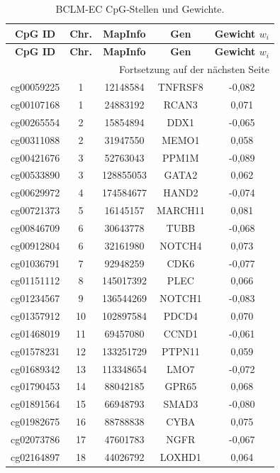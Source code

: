 \documentclass[12pt,a4paper]{article}
\begin{document}
	\begin{longtable}{|c|c|c|c|c|}
		\caption{BCLM‑EC CpG‑Stellen und Gewichte.}\label{tab:cpgs}\\
		\hline
		\textbf{CpG ID} & \textbf{Chr.} & \textbf{MapInfo} & \textbf{Gen} & \textbf{Gewicht \(w_i\)} \\
		\hline
		\endfirsthead
		\hline
		\textbf{CpG ID} & \textbf{Chr.} & \textbf{MapInfo} & \textbf{Gen} & \textbf{Gewicht \(w_i\)} \\
		\hline
		\endhead
		\hline
		\multicolumn{5}{r}{Fortsetzung auf der nächsten Seite}\\
		\endfoot
		\hline
		\endlastfoot
		cg00059225 & 1 & 12148584 & TNFRSF8 & -0,082 \\
		cg00107168 & 1 & 24883192 & RCAN3 & 0,071 \\
		cg00265554 & 2 & 15854894 & DDX1 & -0,065 \\
		cg00311088 & 2 & 31947550 & MEMO1 & 0,058 \\
		cg00421676 & 3 & 52763043 & PPM1M & -0,089 \\
		cg00533890 & 3 & 128855053 & GATA2 & 0,062 \\
		cg00629972 & 4 & 174584677 & HAND2 & -0,074 \\
		cg00721373 & 5 & 16145157 & MARCH11 & 0,081 \\
		cg00846709 & 6 & 30643778 & TUBB & -0,068 \\
		cg00912804 & 6 & 32161980 & NOTCH4 & 0,073 \\
		cg01036791 & 7 & 92948259 & CDK6 & -0,077 \\
		cg01151112 & 8 & 145017392 & PLEC & 0,066 \\
		cg01234567 & 9 & 136544269 & NOTCH1 & -0,083 \\
		cg01357912 & 10 & 102897584 & PDCD4 & 0,070 \\
		cg01468019 & 11 & 69457080 & CCND1 & -0,061 \\
		cg01578231 & 12 & 133251729 & PTPN11 & 0,059 \\
		cg01689342 & 13 & 113348654 & LMO7 & -0,072 \\
		cg01790453 & 14 & 88042185 & GPR65 & 0,068 \\
		cg01891564 & 15 & 66948793 & SMAD3 & -0,080 \\
		cg01982675 & 16 & 88788838 & CYBA & 0,075 \\
		cg02073786 & 17 & 47601783 & NGFR & -0,067 \\
		cg02164897 & 18 & 44026792 & LOXHD1 & 0,064 \\

\end{longtable}
\end{document}

